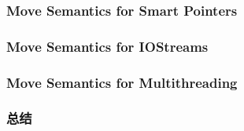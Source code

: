 \documentclass[11pt,a4paper,UTF8]{ctexart}
\begin{document}
		\subsubsection{Move Semantics for Smart Pointers}
		\subsubsection{Move Semantics for IOStreams}
		\subsubsection{Move Semantics for Multithreading}
		\subsubsection{总结}
\end{document}
